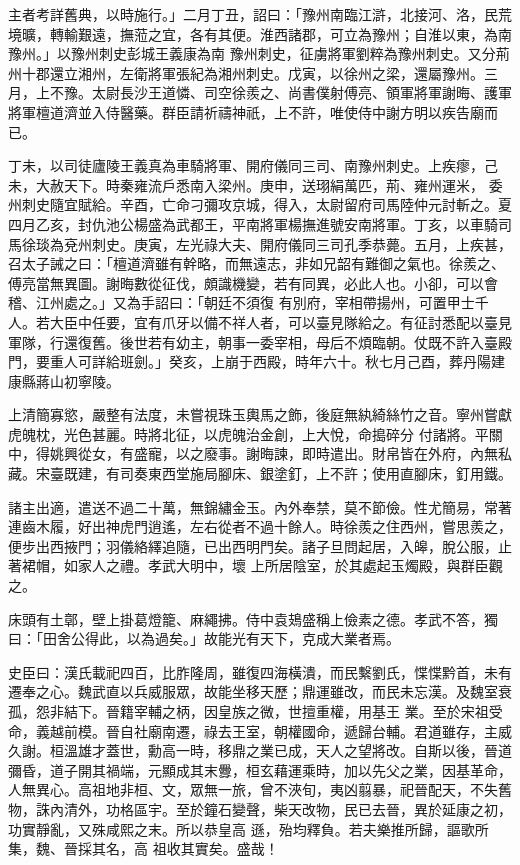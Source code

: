 \begin{pinyinscope}
 主者考詳舊典，以時施行。」二月丁丑，詔曰：「豫州南臨江滸，北接河、洛，民荒境曠，轉輸艱遠，撫蒞之宜，各有其便。淮西諸郡，可立為豫州；自淮以東，為南豫州。」以豫州刺史彭城王義康為南
 豫州刺史，征虜將軍劉粹為豫州刺史。又分荊州十郡還立湘州，左衛將軍張紀為湘州刺史。戊寅，以徐州之梁，還屬豫州。三月，上不豫。太尉長沙王道憐、司空徐羨之、尚書僕射傅亮、領軍將軍謝晦、護軍將軍檀道濟並入侍醫藥。群臣請祈禱神祇，上不許，唯使侍中謝方明以疾告廟而已。



 丁未，以司徒廬陵王義真為車騎將軍、開府儀同三司、南豫州刺史。上疾瘳，己未，大赦天下。時秦雍流戶悉南入梁州。庚申，送珝絹萬匹，荊、雍州運米，
 委州刺史隨宜賦給。辛酉，亡命刁彌攻京城，得入，太尉留府司馬陸仲元討斬之。夏四月乙亥，封仇池公楊盛為武都王，平南將軍楊撫進號安南將軍。丁亥，以車騎司馬徐琰為兗州刺史。庚寅，左光祿大夫、開府儀同三司孔季恭薨。五月，上疾甚，召太子誡之曰：「檀道濟雖有幹略，而無遠志，非如兄韶有難御之氣也。徐羨之、傅亮當無異圖。謝晦數從征伐，頗識機變，若有同異，必此人也。小卻，可以會稽、江州處之。」又為手詔曰：「朝廷不須復
 有別府，宰相帶揚州，可置甲士千人。若大臣中任要，宜有爪牙以備不祥人者，可以臺見隊給之。有征討悉配以臺見軍隊，行還復舊。後世若有幼主，朝事一委宰相，母后不煩臨朝。仗既不許入臺殿門，要重人可詳給班劍。」癸亥，上崩于西殿，時年六十。秋七月己酉，葬丹陽建康縣蔣山初寧陵。



 上清簡寡慾，嚴整有法度，未嘗視珠玉輿馬之飾，後庭無紈綺絲竹之音。寧州嘗獻虎魄枕，光色甚麗。時將北征，以虎魄治金創，上大悅，命搗碎分
 付諸將。平關中，得姚興從女，有盛寵，以之廢事。謝晦諫，即時遣出。財帛皆在外府，內無私藏。宋臺既建，有司奏東西堂施局腳床、銀塗釘，上不許；使用直腳床，釘用鐵。



 諸主出適，遣送不過二十萬，無錦繡金玉。內外奉禁，莫不節儉。性尤簡易，常著連齒木履，好出神虎門逍遙，左右從者不過十餘人。時徐羨之住西州，嘗思羨之，便步出西掖門；羽儀絡繹追隨，已出西明門矣。諸子旦問起居，入皞，脫公服，止著裙帽，如家人之禮。孝武大明中，壞
 上所居陰室，於其處起玉燭殿，與群臣觀之。



 床頭有土鄣，壁上掛葛燈籠、麻繩拂。侍中袁鳷盛稱上儉素之德。孝武不答，獨曰：「田舍公得此，以為過矣。」故能光有天下，克成大業者焉。



 史臣曰：漢氏載祀四百，比胙隆周，雖復四海橫潰，而民繫劉氏，惵惵黔首，未有遷奉之心。魏武直以兵威服眾，故能坐移天歷；鼎運雖改，而民未忘漢。及魏室衰孤，怨非結下。晉籍宰輔之柄，因皇族之微，世擅重權，用基王
 業。至於宋祖受命，義越前模。晉自社廟南遷，祿去王室，朝權國命，遞歸台輔。君道雖存，主威久謝。桓溫雄才蓋世，勳高一時，移鼎之業已成，天人之望將改。自斯以後，晉道彌昏，道子開其禍端，元顯成其末釁，桓玄藉運乘時，加以先父之業，因基革命，人無異心。高祖地非桓、文，眾無一旅，曾不浹旬，夷凶翦暴，祀晉配天，不失舊物，誅內清外，功格區宇。至於鐘石變聲，柴天改物，民已去晉，異於延康之初，功實靜亂，又殊咸熙之末。所以恭皇高
 遜，殆均釋負。若夫樂推所歸，謳歌所集，魏、晉採其名，高
 祖收其實矣。盛哉！



\end{pinyinscope}